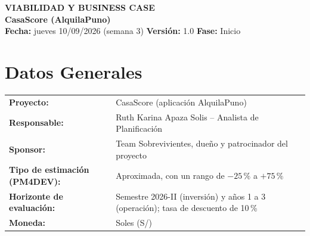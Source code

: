 \documentclass[11pt,a4paper]{article}
\begin{document}
\begin{center}
    {\Large \textbf{\textcolor{AzulUNA}{VIABILIDAD Y BUSINESS CASE}}}\\[3pt]
    {\normalsize \textbf{CasaScore (AlquilaPuno)}}\\[4pt]
    \footnotesize \textbf{Fecha:} jueves 10/09/2026 (semana 3) \quad \textbar\quad \textbf{Versión:} 1.0 \quad \textbar\quad \textbf{Fase:} Inicio
\end{center}

\vspace{0.1cm}

\section{Datos Generales}
\noindent\begin{tabularx}{\textwidth}{@{}P{4.4cm} L@{}}
\toprule
\textbf{Proyecto:} & CasaScore (aplicación AlquilaPuno) \\
\textbf{Responsable:} & Ruth Karina Apaza Solis -- Analista de Planificación \\
\textbf{Sponsor:} & Team Sobrevivientes, dueño y patrocinador del proyecto \\
\textbf{Tipo de estimación (PM4DEV):} & Aproximada, con un rango de $-25\,\%$ a $+75\,\%$ \\
\textbf{Horizonte de evaluación:} & Semestre 2026-II (inversión) y años 1 a 3 (operación); tasa de descuento de 10\,\% \\
\textbf{Moneda:} & Soles (S/) \\
\bottomrule
\end{tabularx}
\end{document}

